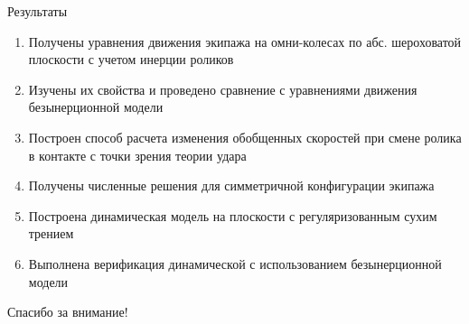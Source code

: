 \begin{frame}{Результаты}
    \begin{enumerate}
        \item Получены уравнения движения экипажа на омни-колесах по абс. шероховатой плоскости с учетом инерции роликов
        \item Изучены их свойства и проведено сравнение с уравнениями движения безынерционной модели
        \item Построен способ расчета изменения обобщенных скоростей при смене ролика в контакте с точки зрения теории удара
        \item Получены численные решения для симметричной конфигурации экипажа
        \item Построена динамическая модель на плоскости с регуляризованным сухим трением
        \item Выполнена верификация динамической с использованием безынерционной модели
    \end{enumerate}
    \vspace{-10pt}
    \centering
    \textcolor{Periwinkle}{Спасибо за внимание!}
\end{frame}
